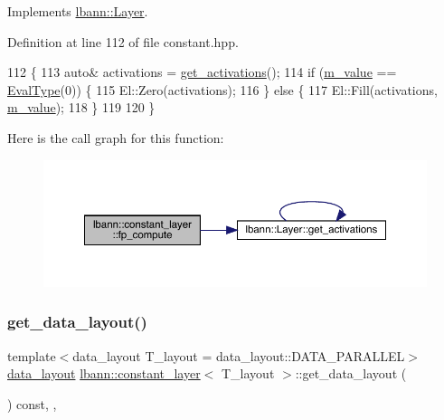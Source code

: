 Implements \hyperlink{classlbann_1_1Layer_a523319dd1bd87a0612afa1912bb5aad7}{lbann\+::\+Layer}.



Definition at line 112 of file constant.\+hpp.


\begin{DoxyCode}
112                              \{
113     \textcolor{keyword}{auto}& activations = \hyperlink{classlbann_1_1Layer_a1134b1a4385af199d7272c5aa827fa99}{get\_activations}();
114     \textcolor{keywordflow}{if} (\hyperlink{classlbann_1_1constant__layer_a8cdb9c854777cc29f1cf1f60da64ef4e}{m\_value} == \hyperlink{base_8hpp_a3266f5ac18504bbadea983c109566867}{EvalType}(0)) \{
115       El::Zero(activations);
116     \} \textcolor{keywordflow}{else} \{
117       El::Fill(activations, \hyperlink{classlbann_1_1constant__layer_a8cdb9c854777cc29f1cf1f60da64ef4e}{m\_value});
118     \}
119     
120   \}
\end{DoxyCode}
Here is the call graph for this function\+:\nopagebreak
\begin{figure}[H]
\begin{center}
\leavevmode
\includegraphics[width=350pt]{classlbann_1_1constant__layer_a15b919ed869f2c815e1613dfb42b317c_cgraph}
\end{center}
\end{figure}
\mbox{\label{classlbann_1_1constant__layer_ac69dbc39164ddb6cee7f61434bdb317d}} 
\subsubsection{\texorpdfstring{get\+\_\+data\+\_\+layout()}{get\_data\_layout()}}
{\footnotesize\ttfamily template$<$data\+\_\+layout T\+\_\+layout = data\+\_\+layout\+::\+D\+A\+T\+A\+\_\+\+P\+A\+R\+A\+L\+L\+EL$>$ \\
\hyperlink{base_8hpp_a786677cbfb3f5677b4d84f3056eb08db}{data\+\_\+layout} \hyperlink{classlbann_1_1constant__layer}{lbann\+::constant\+\_\+layer}$<$ T\+\_\+layout $>$\+::get\+\_\+data\+\_\+layout (\begin{DoxyParamCaption}{ }\end{DoxyParamCaption}) const\hspace{0.3cm}{\ttfamily [inline]}, {\ttfamily [override]}, {\ttfamily [virtual]}}

